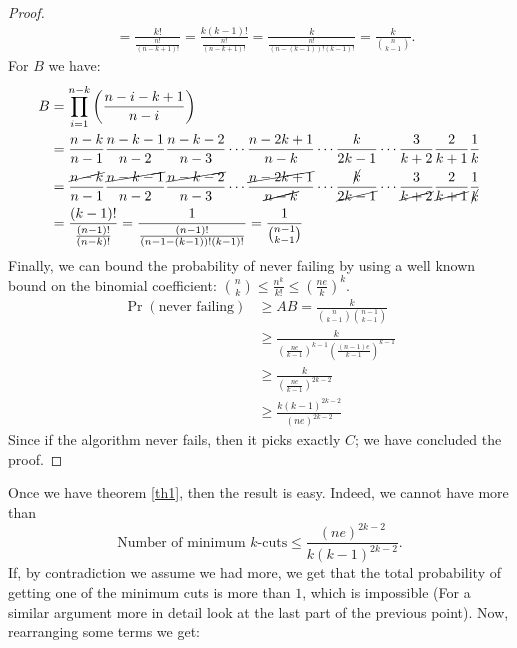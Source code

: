 \documentclass[11pt]{article}
\begin{document}
\begin{enumerate}
\begin{proof}
\begin{align*}
            &= \frac{k!}{\frac{n!}{(n-k+1)!}} = \frac{k(k-1)!}{\frac{n!}{(n-k+1)!}} = \frac{k}{\frac{n!}{(n-(k-1))!(k-1)!}}= \frac{k}{\binom{n}{k-1}}.
        \end{align*}
        For $B$ we have:
        \begin{align*}
            B & = \prod_{i=1}^{n-k}\left(\frac{n-i-k+1}{n-i}\right)\\
            &=\frac{n-k}{n-1}\frac{n-k-1}{n-2}\frac{n-k-2}{n-3}\cdots\frac{n-2k+1}{n-k}\cdots \frac{k}{2k-1}\cdots\frac{3}{k+2}\frac{2}{k+1}\frac{1}{k}\\
            &= \frac{\cancel{n-k}}{n-1}\frac{\cancel{n-k-1}}{n-2}\frac{\cancel{n-k-2}}{n-3}\cdots\frac{\cancel{n-2k+1}}{\cancel{n-k}}\cdots \frac{\cancel{k}}{\cancel{2k-1}}\cdots\frac{3}{\cancel{k+2}}\frac{2}{\cancel{k+1}}\frac{1}{\cancel{k}}\\
            &=\frac{(k-1)!}{\frac{(n-1)!}{(n-k)!}} = \frac{1}{\frac{(n-1)!}{(n-1-(k-1))!(k-1)!}} = \frac{1}{\binom{n-1}{k-1}}
        \end{align*}
        Finally, we can bound the probability of never failing by using a well known bound on the binomial coefficient: $\binom{n}{k}\leq \frac{n^k}{k!} \leq \left(\frac{ne}{k}\right)^k$.
        \begin{align*}
            \Pr\left(\text{never failing}\right) &\geq AB = \frac{k}{\binom{n}{k-1}\binom{n-1}{k-1}}\\
            & \geq \frac{k}{\left(\frac{ne}{k-1}\right)^{k-1}\left(\frac{(n-1)e}{k-1}\right)^{k-1}}\\
            & \geq \frac{k}{\left(\frac{ne}{k-1}\right)^{2k-2}}\\
            & \geq \frac{k(k-1)^{2k-2}}{(ne)^{2k-2}}
        \end{align*}
        Since if the algorithm never fails, then it picks exactly $C$; we have concluded the proof. 
    \end{proof}
    Once we have theorem \ref{th1}, then the result is easy. Indeed, we cannot have more than
    \begin{equation*}
        \text{Number of minimum $k$-cuts} \leq \frac{(ne)^{2k-2}}{k(k-1)^{2k-2}}.
    \end{equation*}
    If, by contradiction we assume we had more, we get that the total probability of getting one of the minimum cuts is more than $1$, which is impossible (For a similar argument more in detail look at the last part of the previous point). Now, rearranging some terms we get:
    \begin{align*}

\end{align*}
\end{enumerate}
\end{document}

